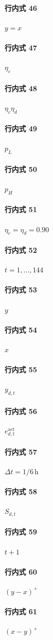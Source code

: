 \documentclass[12pt]{article}
\begin{document}
\paragraph{行内式 46}
\(y=x\)
\paragraph{行内式 47}
\(\eta_c\)
\paragraph{行内式 48}
\(\eta_c\eta_d\)
\paragraph{行内式 49}
\(p_L\)
\paragraph{行内式 50}
\(p_H\)
\paragraph{行内式 51}
\(\eta_c=\eta_d=0.90\)
\paragraph{行内式 52}
\(t=1,\ldots,144\)
\paragraph{行内式 53}
\(y\)
\paragraph{行内式 54}
\(x\)
\paragraph{行内式 55}
\(y_{d,t}\)
\paragraph{行内式 56}
\(e^{\mathrm{act}}_{d,t}\)
\paragraph{行内式 57}
\(\Delta t=1/6\,\mathrm{h}\)
\paragraph{行内式 58}
\(S_{d,t}\)
\paragraph{行内式 59}
\(t+1\)
\paragraph{行内式 60}
\((y-x)^+\)
\paragraph{行内式 61}
\((x-y)^+\)
\end{document}
